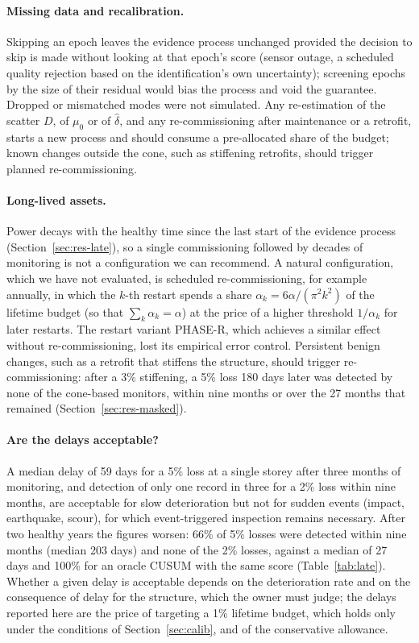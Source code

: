 \documentclass[12pt,a4paper]{article}
\newenvironment{revblock}{}{}
\newenvironment{revblock}{\begingroup\color{revcol}}{\endgroup}
\newcommand{\rtwo}[1]{#1}
\newcommand{\rtwo}[1]{{\color{revcolb}#1}}
\begin{document}
\begin{revblock}
\paragraph{Missing data and recalibration.} Skipping an epoch leaves the evidence process unchanged provided the decision to skip is made without looking at that epoch's score (sensor outage, a scheduled quality rejection based on the identification's own uncertainty); screening epochs by the size of their residual would bias the process and void the guarantee. Dropped or mismatched modes were not simulated. Any re-estimation of the scatter $D$, of $\mu_0$ or of $\hat\delta$, and any re-commissioning after maintenance or a retrofit, starts a new process and should consume a pre-allocated share of the budget; known changes outside the cone, such as stiffening retrofits, should trigger planned re-commissioning.

\paragraph{Long-lived assets.} Power decays with the healthy time since the last start of the evidence process (Section~\ref{sec:res-late}), so a single commissioning followed by decades of monitoring is not a configuration we can recommend. A natural configuration, which we have not evaluated, is scheduled re-commissioning, for example annually, in which the $k$-th restart spends a share $\alpha_k=6\alpha/(\pi^2k^2)$ of the lifetime budget (so that $\sum_k\alpha_k=\alpha$) at the price of a higher threshold $1/\alpha_k$ for later restarts. The restart variant PHASE-R, which achieves a similar effect without re-commissioning, lost its empirical error control. \rtwo{Persistent benign changes, such as a retrofit that stiffens the structure, should trigger re-commissioning: after a 3\% stiffening, a 5\% loss 180 days later was detected by none of the cone-based monitors, within nine months or over the 27 months that remained (Section~\ref{sec:res-masked}).}

\paragraph{Are the delays acceptable?} \rtwo{A median delay of 59 days for a 5\% loss at a single storey after three months of monitoring, and detection of only one record in three for a 2\% loss within nine months, are acceptable for slow deterioration but not for sudden events (impact, earthquake, scour), for which event-triggered inspection remains necessary.} \rtwo{After two healthy years the figures worsen: 66\% of 5\% losses were detected within nine months (median 203 days) and none of the 2\% losses, against a median of 27 days and 100\% for an oracle CUSUM with the same score (Table~\ref{tab:late}).} \rtwo{Whether a given delay is acceptable depends on the deterioration rate and on the consequence of delay for the structure, which the owner must judge; the delays reported here are the price of targeting a 1\% lifetime budget, which holds only under the conditions of Section~\ref{sec:calib}, and of the conservative allowance.}
\end{revblock}
\end{document}
